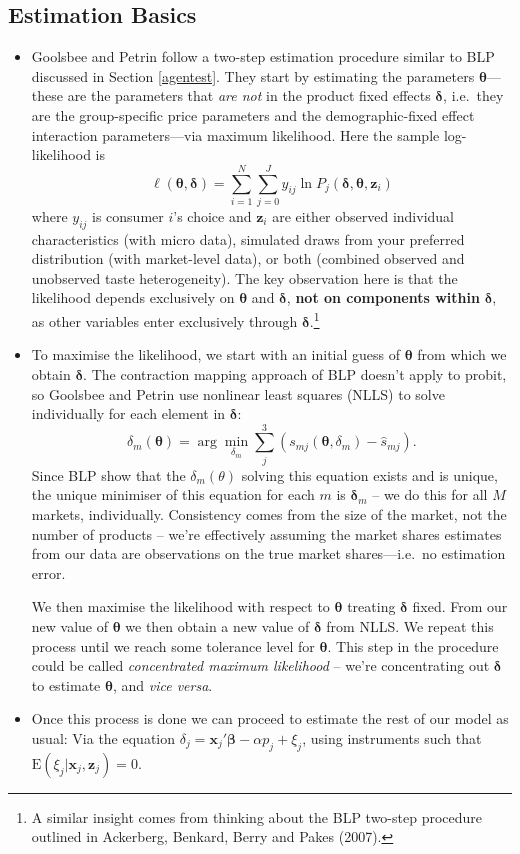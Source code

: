 \documentclass[11pt]{article}
\begin{document}
\subsection{Estimation Basics}
	\begin{itemize}
		\item Goolsbee and Petrin follow a two-step estimation procedure similar to BLP discussed in Section \ref{agentest}. They start by estimating the parameters $\bm{\theta}$---these are the parameters that \textit{are not} in the product fixed effects $\bm{\delta}$, i.e.\ they are the group-specific price parameters and the demographic-fixed effect interaction parameters---via maximum likelihood. Here the sample log-likelihood is
		\begin{equation}
		\ell(\bm{\theta},\bm{\delta}) = \sum_{i=1}^{N}\sum_{j=0}^{J}y_{ij}\ln P_j(\bm{\delta},\bm{\theta},\bm{z}_i)
		\end{equation}
		where $y_{ij}$ is consumer $i$'s choice and $\bm{z}_i$ are either observed individual characteristics (with micro data), simulated draws from your preferred distribution (with market-level data), or both (combined observed and unobserved taste heterogeneity). The key observation here is that the likelihood  depends exclusively on $\bm{\theta}$ and $\bm{\delta}$, \textbf{not on components within} $\bm{\delta}$, as other variables enter exclusively through $\bm{\delta}$.\footnote{A similar insight comes from thinking about the BLP two-step procedure outlined in Ackerberg, Benkard, Berry and Pakes (2007).}
		\item To maximise the likelihood, we start with an initial guess of $\bm{\theta}$ from which we obtain $\bm{\delta}$. The contraction mapping approach of BLP doesn't apply to probit, so Goolsbee and Petrin use nonlinear least squares (NLLS) to solve individually for each element in $\bm{\delta}$:
		\begin{equation}
		\delta_m(\bm{\theta}) = \arg\min_{\delta_m}\sum_j^{3}(s_{mj}(\bm{\theta}, \delta_m)-\hat{s}_{mj}).
		\end{equation}
		Since BLP show that the $\delta_m(\theta)$ solving this equation exists and is unique, the unique minimiser of this equation for each $m$ is $\bm{\delta}_m$ -- we do this for all $M$ markets, individually.
		Consistency comes from the size of the market, not the number of products -- we're effectively assuming the market shares estimates from our data are observations on the true market shares---i.e.\ no estimation error.


		We then maximise the likelihood with respect to $\bm{\theta}$ treating $\bm{\delta}$ fixed. From our new value of $\bm{\theta}$ we then obtain a new value of $\bm{\delta}$ from NLLS. We repeat this process until we reach some tolerance level for $\bm{\theta}$.
		This step in the procedure could be called \textit{concentrated maximum likelihood} -- we're concentrating out $\bm{\delta}$ to estimate $\bm{\theta}$, and \textit{vice versa}.
		\item Once this process is done we can proceed to estimate the rest of our model as usual: Via the equation $\delta_j = \bm{x}_j'\bm{\beta}-\alpha p_j + \xi_j$, using instruments such that $\text{E}(\xi_j|\bm{x}_j,\bm{z}_j)=0$.
	\end{itemize}
\end{document}
